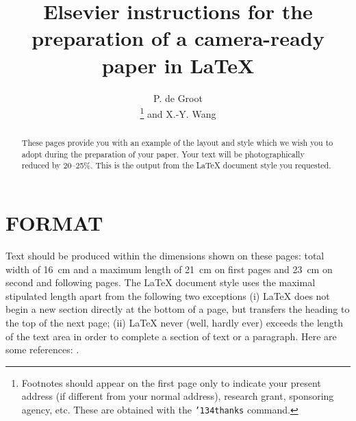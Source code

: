 
\newcommand{\ttbs}{\char'134}
\newcommand{\AmS}{{\protect\the\textfont2
  A\kern-.1667em\lower.5ex\hbox{M}\kern-.125emS}}


\title{Elsevier instructions for the preparation of a 
       camera-ready paper in \LaTeX}

\author{P. de Groot\address{Mathematics and Computer Science Division, 
        Elsevier Science Publishers B.V., \\ 
        P.O. Box 103, 1000 AC Amsterdam, The Netherlands}%
        \thanks{Footnotes should appear on the first page only to
                indicate your present address (if different from your
                normal address), research grant, sponsoring agency, etc.
                These are obtained with the {\tt\ttbs thanks} command.}
        and 
        X.-Y. Wang\address{Economics Department, University of Winchester, \\
        2 Finch Road, Winchester, Hampshire P3L T19, United Kingdom}}




\maketitle

\begin{abstract}
These pages provide you with an example of the layout and style which
we wish you to adopt during the preparation of your paper. Your text
will be photographically reduced by 20--25\%. This is the output from
the \LaTeX{} document style you requested.
\end{abstract}

\section{FORMAT}

Text should be produced within the dimensions shown on these pages:
total width of 16~cm and a maximum length of 21~cm on first pages and
23~cm on second and following pages. The \LaTeX{} document style uses
the maximal stipulated length apart from the following two exceptions
(i) \LaTeX{} does not begin a new section directly at the bottom of a
page, but transfers the heading to the top of the next page; (ii)
\LaTeX{} never (well, hardly ever) exceeds the length of the text area
in order to complete a section of text or a paragraph.
Here are some references: \cite{Scho70,Mazu84}.


